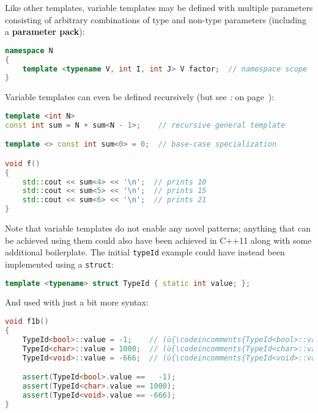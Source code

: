 \noindent Like other templates, variable templates may be defined with multiple
parameters consisting of arbitrary combinations of type and non-type
parameters (including a \textbf{parameter pack}):

\begin{lstlisting}[language=C++]
namespace N
{
    template <typename V, int I, int J> V factor;  // namespace scope
}
\end{lstlisting}
    
\noindent Variable templates can even be defined recursively (but see
{\it{}:} {\it{}} on page~\pageref{recursive-variable-template-initializations-require-const-or-constexpr}):

\begin{lstlisting}[language=C++]
template <int N>
const int sum = N + sum<N - 1>;    // recursive general template

template <> const int sum<0> = 0;  // base-case specialization

void f()
{
    std::cout << sum<4> << '\n';  // prints 10
    std::cout << sum<5> << '\n';  // prints 15
    std::cout << sum<6> << '\n';  // prints 21
}
\end{lstlisting}
    
\noindent Note that variable templates do not enable any novel patterns;
anything that can be achieved using them could also have been achieved
in C++11 along with some additional boilerplate. The initial
\texttt{typeId} example could have instead been implemented using a
\texttt{struct}:

\begin{lstlisting}[language=C++]
template <typename> struct TypeId { static int value; };
\end{lstlisting}
    
\noindent And used with just a bit more syntax:

\begin{lstlisting}[language=C++]
 void f1b()
{
    TypeId<bool>::value = -1;    // (ù{\codeincomments{TypeId<bool>::value}}ù) is an (ù{\codeincomments{int}}ù).
    TypeId<char>::value = 1000;  // (ù{\codeincomments{TypeId<char>::value}}ù) is an (ù{\codeincomments{int}}ù).
    TypeId<void>::value = -666;  // (ù{\codeincomments{TypeId<void>::value}}ù) is an (ù{\codeincomments{int}}ù).

    assert(TypeId<bool>.value ==   -1);
    assert(TypeId<char>.value == 1000);
    assert(TypeId<void>.value == -666);
}
\end{lstlisting}
    

